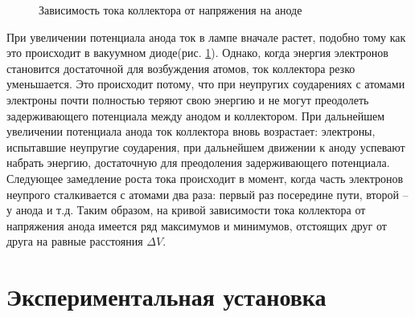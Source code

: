 \documentclass[12pt,a4paper]{article}
\begin{document}
\begin{figure} \label{dependency} 
\vspace{-6ex}  
\caption{Зависимость тока коллектора от напряжения на аноде}
\end{figure}

При увеличении потенциала анода ток в лампе вначале растет, подобно тому как это происходит в вакуумном диоде(рис. \ref{dependency}). Однако, когда энергия электронов становится достаточной для возбуждения атомов, ток коллектора резко уменьшается. Это происходит потому, что при неупругих соударениях с атомами электроны почти полностью теряют свою энергию и не могут преодолеть задерживающего потенциала между анодом и коллектором. При дальнейшем увеличении потенциала анода ток коллектора вновь возрастает: электроны, испытавшие неупругие соударения, при дальнейшем движении к аноду успевают набрать энергию, достаточную для преодоления задерживающего потенциала. Следующее замедление роста тока происходит в момент, когда часть электронов неупрого сталкивается с атомами два раза: первый раз посередине пути, второй -- у анода и т.д. Таким образом, на кривой зависимости тока коллектора от напряжения анода имеется ряд максимумов и минимумов, отстоящих друг от друга на равные расстояния $\Delta V$.

\section{Экспериментальная установка}
\end{document}

